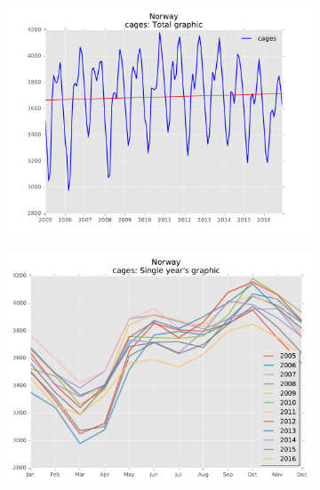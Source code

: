 \begin{figure}[H]
\begin{subfigure}{.5\textwidth}
	\centering
    \includegraphics[width=1\textwidth]{Files/Cages_Total.pdf}
\end{subfigure}%
\begin{subfigure}{.5\textwidth}
	\centering
    \includegraphics[width=1\textwidth]{Files/Cages_Years.pdf}
\end{subfigure}%
\end{figure} 


